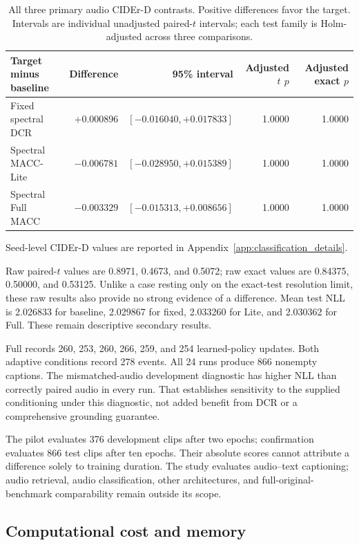\documentclass[a4paper,fleqn]{cas-dc}
\let\CAENLcaption\caption
\let\caption\CAENLcaption
\begin{document}
\begin{table}[pos=tbp]
\caption{All three primary audio CIDEr-D contrasts.
Positive differences favor the target.
Intervals are individual unadjusted paired-$t$ intervals;
each test family is Holm-adjusted across three comparisons.}
\label{tab:audio_contrasts}
\centering\small
\begin{tabularx}{\textwidth}{@{}Yrrrr@{}}
\toprule
Target minus baseline & Difference & 95\% interval &
Adjusted $t$ $p$ & Adjusted exact $p$ \\
\midrule
Fixed spectral DCR &
+0.000896 & $[-0.016040,+0.017833]$ & 1.0000 & 1.0000 \\
Spectral MACC-Lite &
$-0.006781$ & $[-0.028950,+0.015389]$ & 1.0000 & 1.0000 \\
Spectral Full MACC &
$-0.003329$ & $[-0.015313,+0.008656]$ & 1.0000 & 1.0000 \\
\bottomrule
\end{tabularx}
\end{table}


Seed-level CIDEr-D values are reported in Appendix~\ref{app:classification_details}.

Raw paired-$t$ values are 0.8971, 0.4673, and 0.5072;
raw exact values are 0.84375, 0.50000, and 0.53125.
Unlike a case resting only on the exact-test resolution limit,
these raw results also provide no strong evidence of a difference.
Mean test NLL is 2.026833 for baseline, 2.029867 for fixed,
2.033260 for Lite, and 2.030362 for Full.
These remain descriptive secondary results.

Full records 260, 253, 260, 266, 259, and 254 learned-policy
updates. Both adaptive conditions record 278 events.
All 24 runs produce 866 nonempty captions.
The mismatched-audio development diagnostic has higher NLL
than correctly paired audio in every run.
That establishes sensitivity to the supplied conditioning
under this diagnostic, not added benefit from DCR or
a comprehensive grounding guarantee.

The pilot evaluates 376 development clips after two epochs;
confirmation evaluates 866 test clips after ten epochs.
Their absolute scores cannot attribute a difference solely
to training duration.
The study evaluates audio--text captioning; audio retrieval, audio classification,
other architectures, and full-original-benchmark comparability
remain outside its scope.


\subsection{Computational cost and memory}
\label{sec:overhead}
\end{document}
